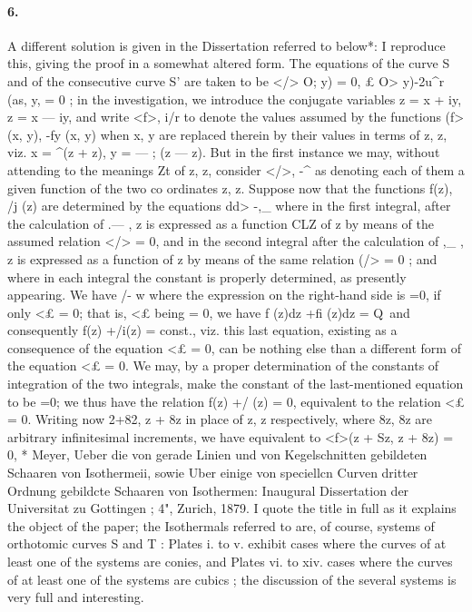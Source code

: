 \documentclass[11pt,a4paper]{book}
\begin{document}
{{{{{{\paragraph{6.} A  different  solution  is  given  in  the  Dissertation  referred  to  below*:  I  reproduce
this,  giving  the  proof  in  a  somewhat  altered  form.  The  equations  of  the  curve  S
and  of  the  consecutive  curve  S'  are  taken  to  be
</>  O;  y)  =  0,     £  O>  y)-2u^r  (as,  y,  =  0  ;
in  the  investigation,  we  introduce  the  conjugate  variables  z  =  x  +  iy,  z  =  x  ---  iy,  and
write  <f>,  i/r  to  denote  the  values  assumed  by  the  functions  (f>  (x, y),  -fy  (x,  y)  when
x,  y  are  replaced  therein  by  their  values  in  terms  of  z,  z,  viz.  x  =  ^(z  +  z),
y  =  ---  ;  (z  ---  z).      But   in   the   first   instance    we    may,    without   attending   to    the   meanings
Zt
of  z,  z,  consider  </>,  -^  as  denoting  each  of  them  a  given  function  of  the  two  co
ordinates  z,  z.
Suppose  now  that  the  functions  f(z),  /j  (z)  are  determined  by  the  equations
dd>  -,\_
where  in  the  first   integral,   after   the   calculation   of     .---  ,   z   is   expressed   as   a   function
CLZ
of    z    by   means    of    the    assumed   relation    </>  =  0,   and   in   the   second   integral   after   the
calculation   of     ,\_  ,   z   is   expressed   as   a   function    of   z   by   means   of  the   same   relation
(/>  =  0  ;    and   where   in    each    integral    the   constant    is   properly   determined,   as    presently
appearing.
We  have
/-  w
where  the  expression  on  the  right-hand  side  is  =0,  if  only  <£  =  0;  that  is,  <£  being
=  0,  we  have  f  (z)dz  +fi  (z)dz  =  Q\  and  consequently  f(z)  +/i(z)  =  const.,  viz.  this  last
equation,  existing  as  a  consequence  of  the  equation  <£  =  0,  can  be  nothing  else  than
a  different  form  of  the  equation  <£  =  0.  We  may,  by  a  proper  determination  of  the
constants  of  integration  of  the  two  integrals,  make  the  constant  of  the  last-mentioned
equation  to  be  =0;  we  thus  have  the  relation  f(z)  +/  (z)  =  0,  equivalent  to  the
relation  <£  =  0.
Writing   now    2+82,   z  +  8z  in  place  of  z,  z   respectively,  where  8z,  8z  are  arbitrary
infinitesimal  increments,  we  have
equivalent  to
<f>(z  +  Sz,  z  +  8z)  =  0,
*  Meyer,  Ueber  die  von  gerade  Linien  und  von  Kegelschnitten  gebildeten  Schaaren  von  Isothermeii,  sowie
Uber  einige  von  speciellcn  Curven  dritter  Ordnung  gebildcte  Schaaren  von  Isothermen:  Inaugural  Dissertation
der  Universitat  zu  Gottingen  ;  4",  Zurich,  1879.  I  quote  the  title  in  full  as  it  explains  the  object  of  the
paper;  the  Isothermals  referred  to  are,  of  course,  systems  of  orthotomic  curves  S  and  T  :  Plates  i.  to  v.
exhibit  cases  where  the  curves  of  at  least  one  of  the  systems  are  conies,  and  Plates  vi.  to  xiv.  cases  where
the  curves  of  at  least  one  of  the  systems  are  cubics  ;  the  discussion  of  the  several  systems  is  very  full
and  interesting.


}}}}}}
\end{document}
